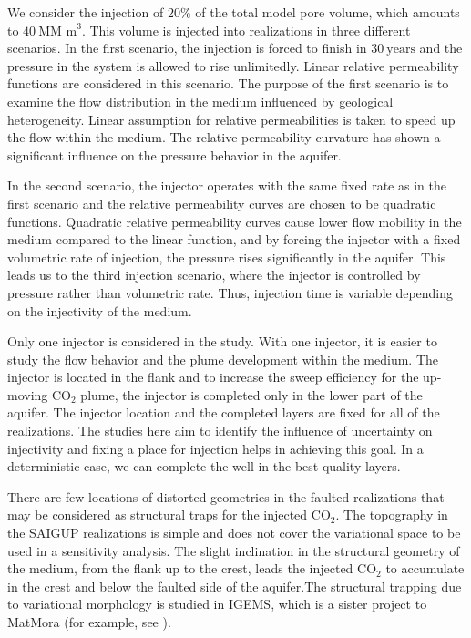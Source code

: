 We consider the injection of $20\%$ of the total model pore volume,
which amounts to $40~\mbox{MM m}^3$. This volume is injected into realizations
in three different scenarios. In the first scenario, the injection is forced to
finish in
$30~\mbox{years}$ and the pressure in the system is allowed to rise
unlimitedly. Linear relative permeability functions are considered in this
scenario. The purpose of the first scenario is to examine the flow distribution
in
the medium influenced by geological heterogeneity. Linear assumption for
relative permeabilities is taken to speed up the flow within the medium. The
relative permeability curvature has shown a significant influence on the
pressure behavior in the  aquifer. 

In the second scenario, the injector operates with the same fixed rate as in the
first scenario and the relative permeability curves are chosen to be quadratic
functions. Quadratic relative permeability curves cause lower flow mobility in
the medium compared to the linear function, and by forcing the injector with a
fixed volumetric rate of injection, the pressure rises significantly in the
aquifer. This leads us to the third injection scenario, where the injector is
controlled by pressure rather than volumetric rate. Thus, injection time is
variable depending on the injectivity of the medium.

Only one injector is considered in the study. With one injector, it is easier to
study the flow behavior and the plume development within the medium. The
injector is
located in the flank and to increase the sweep efficiency for the
up-moving $\mbox{CO}_2$ plume, the injector is completed only in the lower part
of
the aquifer. The injector location and the completed layers are fixed for all of
the realizations. The studies here aim to identify the influence of uncertainty
on injectivity and fixing a place for injection helps in achieving this goal. In
a deterministic case, we can complete the well in the best quality layers. 

There are few locations of distorted geometries in the faulted realizations that
may be considered as structural traps for the injected $\mbox{CO}_2$. The
topography in the SAIGUP realizations is simple and does not cover the
variational space to be used in a sensitivity analysis. The slight inclination
in the structural geometry of the medium, from the flank up to the crest, leads
the injected $\mbox{CO}_2$  to accumulate in the crest and below the faulted
side of the aquifer.The structural trapping due to variational morphology is
studied in IGEMS, which is a sister project to MatMora (for example, see
\cite{syversveenstudy}). 

